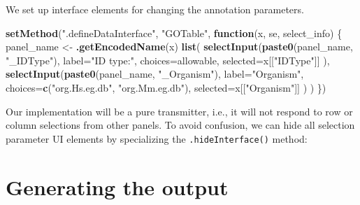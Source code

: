\documentclass[]{book}
\newenvironment{Shaded}{\begin{snugshade}}{\end{snugshade}}
\newcommand{\KeywordTok}[1]{\textcolor[rgb]{0.13,0.29,0.53}{\textbf{#1}}}
\newcommand{\DataTypeTok}[1]{\textcolor[rgb]{0.13,0.29,0.53}{#1}}
\newcommand{\StringTok}[1]{\textcolor[rgb]{0.31,0.60,0.02}{#1}}
\newcommand{\OtherTok}[1]{\textcolor[rgb]{0.56,0.35,0.01}{#1}}
\newcommand{\ControlFlowTok}[1]{\textcolor[rgb]{0.13,0.29,0.53}{\textbf{#1}}}
\newcommand{\OperatorTok}[1]{\textcolor[rgb]{0.81,0.36,0.00}{\textbf{#1}}}
\newcommand{\NormalTok}[1]{#1}
\begin{document}
We set up interface elements for changing the annotation parameters.

\begin{Shaded}
\begin{Highlighting}[]
\KeywordTok{setMethod}\NormalTok{(}\StringTok{".defineDataInterface"}\NormalTok{, }\StringTok{"GOTable"}\NormalTok{, }\ControlFlowTok{function}\NormalTok{(x, se, select_info) \{}
\NormalTok{    panel_name <-}\StringTok{ }\KeywordTok{.getEncodedName}\NormalTok{(x)}
    \KeywordTok{list}\NormalTok{(}
        \KeywordTok{selectInput}\NormalTok{(}\KeywordTok{paste0}\NormalTok{(panel_name, }\StringTok{"_IDType"}\NormalTok{),}
            \DataTypeTok{label=}\StringTok{"ID type:"}\NormalTok{,}
            \DataTypeTok{choices=}\NormalTok{allowable,}
            \DataTypeTok{selected=}\NormalTok{x[[}\StringTok{"IDType"}\NormalTok{]]}
\NormalTok{        ),}
        \KeywordTok{selectInput}\NormalTok{(}\KeywordTok{paste0}\NormalTok{(panel_name, }\StringTok{"_Organism"}\NormalTok{),}
            \DataTypeTok{label=}\StringTok{"Organism"}\NormalTok{,}
            \DataTypeTok{choices=}\KeywordTok{c}\NormalTok{(}\StringTok{"org.Hs.eg.db"}\NormalTok{, }\StringTok{"org.Mm.eg.db"}\NormalTok{),}
            \DataTypeTok{selected=}\NormalTok{x[[}\StringTok{"Organism"}\NormalTok{]]}
\NormalTok{        )}
\NormalTok{    )}
\NormalTok{\})}
\end{Highlighting}
\end{Shaded}

Our implementation will be a pure transmitter, i.e., it will not respond
to row or column selections from other panels. To avoid confusion, we
can hide all selection parameter UI elements by specializing the
\texttt{.hideInterface()} method:

\begin{Shaded}
\end{Shaded}

\section{Generating the output}\label{generating-the-output}
\end{document}
